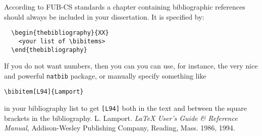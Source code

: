\begin{thebibliography}{XX}
According to FUB-CS standards a chapter containing bibliographic
references should always be included in your dissertation.
It is specified by:
\begin{verbatim}
  \begin{thebibliography}{XX}
    <your list of \bibitems>
  \end{thebibliography}
\end{verbatim}
If you do not want numbers, then you can you can use, for instance, the very nice and powerful \texttt{natbib} package, or manually specify something like
\begin{verbatim}
\bibitem[L94]{Lamport}
\end{verbatim}
in your bibliography list to get \verb|[L94]| both in the text and between the square brackets in the bibliography. 
L. Lamport. {\em \LaTeX{} User's Guide \& Reference
Manual\/}, Addison-Wesley Publishing Company, Reading, Mass. 1986, 1994.
\end{thebibliography}


